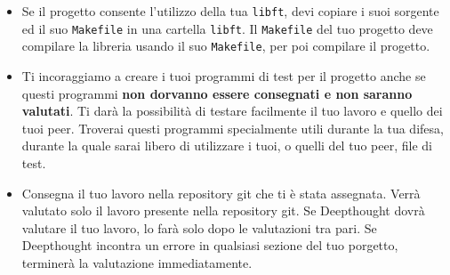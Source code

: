 \begin{itemize}
	\item Se il progetto consente l'utilizzo della tua \texttt{libft}, devi copiare i suoi sorgente
	ed il suo \texttt{Makefile} in una cartella \texttt{libft}.
	Il \texttt{Makefile} del tuo progetto deve compilare la libreria usando il suo \texttt{Makefile}, per poi compilare il progetto.

	\item Ti incoraggiamo a creare i tuoi programmi di test
	per il progetto anche se questi programmi \textbf{non dorvanno
	essere consegnati e non saranno valutati}. Ti darà la possibilità
	di testare facilmente il tuo lavoro e quello dei tuoi peer. Troverai questi
	programmi specialmente utili durante la tua difesa, durante la quale 
	sarai libero di utilizzare i tuoi, o quelli del tuo peer, file di test.

	 \item Consegna il tuo lavoro nella repository git che ti è stata assegnata.
	 Verrà valutato solo il lavoro presente nella repository git. Se Deepthought 
	 dovrà valutare il tuo lavoro, lo farà solo dopo le valutazioni tra pari.
	 Se Deepthought incontra un errore in qualsiasi sezione del tuo porgetto,
	 terminerà la valutazione immediatamente.
     
    \end{itemize}
